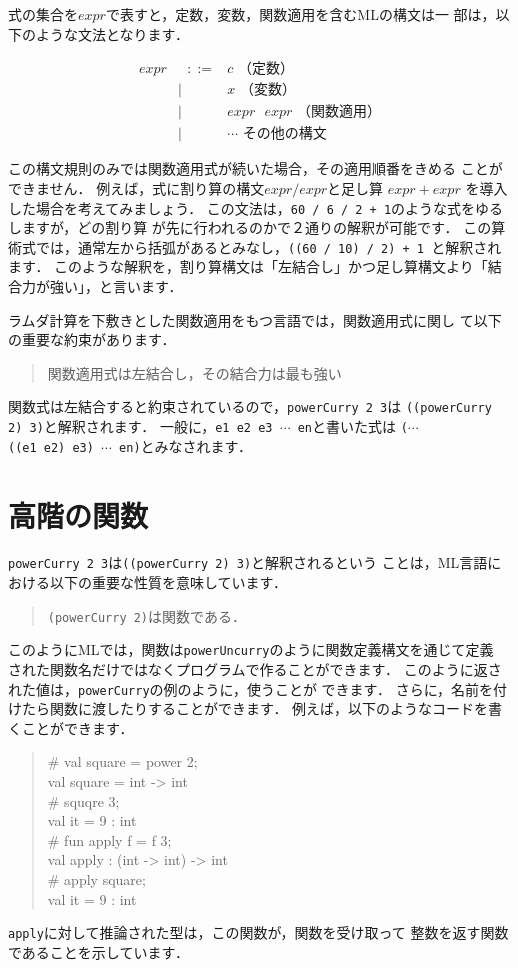 \documentclass{jbook}
\newcommand{\myem}{\ \ \ \ \  }
\begin{document}
	式の集合を$expr$で表すと，定数，変数，関数適用を含むMLの構文は一
部は，以下のような文法となります．
\begin{tt}
\begin{eqnarray*}
expr &\mbox{\ \ }::=& c                  \mbox{\myem\myem （定数）} \\
     &|& x                    \mbox{\myem\myem （変数）} \\
     &|& expr\mbox{\ } expr   \mbox{\ （関数適用）} \\
     &|& \cdots               \mbox{\myem\myem その他の構文}
\end{eqnarray*}
\end{tt}

	この構文規則のみでは関数適用式が続いた場合，その適用順番をきめる
ことができません．
	例えば，式に割り算の構文$expr / expr$と足し算
$expr + expr$
を導入した場合を考えてみましょう．
	この文法は，{\tt 60 / 6 / 2 + 1}のような式をゆるしますが，どの割り算
が先に行われるのかで２通りの解釈が可能です．
	この算術式では，通常左から括弧があるとみなし，{\tt ((60 / 10) /
2) + 1 }と解釈されます．
	このような解釈を，割り算構文は「左結合し」かつ足し算構文より「結
合力が強い」，と言います．

	ラムダ計算を下敷きとした関数適用をもつ言語では，関数適用式に関し
て以下の重要な約束があります．
\begin{quote}
関数適用式は左結合し，その結合力は最も強い
\end{quote}
	関数式は左結合すると約束されているので，{\tt powerCurry 2 3}は
{\tt ((powerCurry 2) 3)}と解釈されます．
	一般に，{\tt e1\ e2\ e3\ $\cdots$\ en}と書いた式は
{\tt ($\cdots$ ((e1\ e2)\ e3)\ $\cdots$\ en)}とみなされます．

\section{高階の関数}
\label{sec:tutorialHeigher-order-fun}


	{\tt powerCurry 2 3}は{\tt ((powerCurry 2) 3)}と解釈されるという
ことは，ML言語における以下の重要な性質を意味しています．
\begin{quote}
{\tt (powerCurry 2)}は関数である．
\end{quote}
	このようにMLでは，関数は{\tt powerUncurry}のように関数定義構文を通じて定義
された関数名だけではなくプログラムで作ることができます．
	このように返された値は，{\tt powerCurry}の例のように，使うことが
できます．
	さらに，名前を付けたら関数に渡したりすることができます．
	例えば，以下のようなコードを書くことができます．
\begin{quote}
\# val square = power 2;\\
val square = int -> int\\
\# squqre 3;\\
val it = 9 : int\\
\# fun apply f = f 3;\\
val apply : (int -> int) -> int\\
\# apply square;\\
val it = 9 : int
\end{quote}
	{\tt apply}に対して推論された型は，この関数が，関数を受け取って
整数を返す関数であることを示しています．
\end{document}
